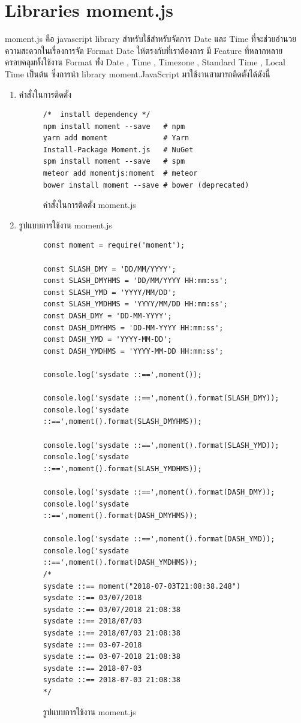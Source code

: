 \section{Libraries moment.js}
moment.js คือ javascript library สำหรับใช้สำหรับจัดการ Date และ Time ที่จะช่วยอำนวยความสะดวกในเรื่องการจัด Format Date ให้ตรงกับที่เราต้องการ
มี Feature ที่หลากหลายครอบคลุมทั้งใช้งาน Format ทั้ง Date , Time , Timezone , Standard Time , Local Time เป็นต้น ซึ่งการนำ library moment.JavaScript 
มาใช้งานสามารถติดตั้งได้ดังนี้
\begin{enumerate}
	\item คำสั่งในการติดตั้ง
	\begin{figure}[H]
		{\begin{lstlisting}
/*  install dependency */
npm install moment --save   # npm
yarn add moment             # Yarn
Install-Package Moment.js   # NuGet
spm install moment --save   # spm
meteor add momentjs:moment  # meteor
bower install moment --save # bower (deprecated)
		\end{lstlisting}}
	\centering
		\caption{คำสั่งในการติดตั้ง moment.js}
		\label{Fig:momentjs}
	\end{figure}

	\item รูปแบบการใช้งาน moment.js
	\begin{figure}[H]
		{\begin{lstlisting}
const moment = require('moment');

const SLASH_DMY = 'DD/MM/YYYY';
const SLASH_DMYHMS = 'DD/MM/YYYY HH:mm:ss';
const SLASH_YMD = 'YYYY/MM/DD';
const SLASH_YMDHMS = 'YYYY/MM/DD HH:mm:ss';
const DASH_DMY = 'DD-MM-YYYY';
const DASH_DMYHMS = 'DD-MM-YYYY HH:mm:ss';
const DASH_YMD = 'YYYY-MM-DD';
const DASH_YMDHMS = 'YYYY-MM-DD HH:mm:ss';
			
console.log('sysdate ::==',moment());
			
console.log('sysdate ::==',moment().format(SLASH_DMY));
console.log('sysdate ::==',moment().format(SLASH_DMYHMS));
			
console.log('sysdate ::==',moment().format(SLASH_YMD));
console.log('sysdate ::==',moment().format(SLASH_YMDHMS));
			
console.log('sysdate ::==',moment().format(DASH_DMY));
console.log('sysdate ::==',moment().format(DASH_DMYHMS));
			
console.log('sysdate ::==',moment().format(DASH_YMD));
console.log('sysdate ::==',moment().format(DASH_YMDHMS));
/*
sysdate ::== moment("2018-07-03T21:08:38.248")
sysdate ::== 03/07/2018
sysdate ::== 03/07/2018 21:08:38
sysdate ::== 2018/07/03
sysdate ::== 2018/07/03 21:08:38
sysdate ::== 03-07-2018
sysdate ::== 03-07-2018 21:08:38
sysdate ::== 2018-07-03
sysdate ::== 2018-07-03 21:08:38
*/
		\end{lstlisting}}
	\centering
		\caption{รูปแบบการใช้งาน moment.js}
		\label{Fig:howtomomentjs}
	\end{figure}


\end{enumerate}
